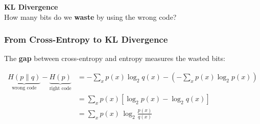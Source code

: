 \documentclass[aspectratio=169]{beamer}
\begin{document}
\begin{frame}
\begin{center}
\vspace{1cm}
{\LARGE\bfseries\textcolor{popblue}{KL Divergence}}\\[15pt]
{\large How many bits do we \textbf{waste} by using the wrong code?}
\end{center}
\end{frame}

\begin{frame}
\frametitle{From Cross-Entropy to KL Divergence}

\small
The \textbf{gap} between cross-entropy and entropy measures the wasted bits:

\vspace{-0.2cm}
\begin{align*}
  \underbrace{H(p \| q)}_{\text{wrong code}} - \underbrace{H(p)}_{\text{right code}}
  &= -\sum_x p(x)\log_2 q(x) - \left(-\sum_x p(x)\log_2 p(x)\right)\\[2pt]
  &= \sum_x p(x)\left[\log_2 p(x) - \log_2 q(x)\right]\\[2pt]
  &= \sum_x p(x)\,\log_2 \frac{p(x)}{q(x)}
\end{align*}

\pause
\vspace{-0.35cm}
\begin{center}
\end{center}
\end{frame}
\end{document}
